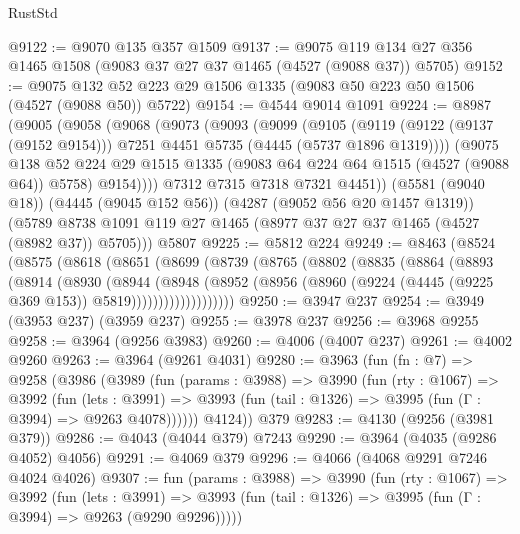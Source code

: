 \begin{lexlean}{RustStd}
\begin{coremodule}
@9122 := @9070 @135 @357 @1509
@9137 := @9075 @119 @134 @27 @356 @1465 @1508 (@9083 @37 @27 @37 @1465 (@4527 (@9088 @37)) @5705)
@9152 := @9075 @132 @52 @223 @29 @1506 @1335 (@9083 @50 @223 @50 @1506 (@4527 (@9088 @50)) @5722)
@9154 := @4544 @9014 @1091
@9224 := @8987
    (@9005
      (@9058
        (@9068
          (@9073
            (@9093
              (@9099
                (@9105
                  (@9119
                    (@9122 (@9137 (@9152 @9154)))
                    @7251
                    @4451
                    @5735
                    (@4445 (@5737 @1896 @1319))))
                (@9075
                  @138
                  @52
                  @224
                  @29
                  @1515
                  @1335
                  (@9083 @64 @224 @64 @1515 (@4527 (@9088 @64)) @5758)
                  @9154))))
          @7312
          @7315
          @7318
          @7321
          @4451))
      (@5581 (@9040 @18))
      (@4445 (@9045 @152 @56))
      (@4287 (@9052 @56 @20 @1457 @1319))
      (@5789 @8738 @1091 @119 @27 @1465 (@8977 @37 @27 @37 @1465 (@4527 (@8982 @37)) @5705)))
    @5807
@9225 := @5812 @224
@9249 := @8463
    (@8524
      (@8575
        (@8618
          (@8651
            (@8699
              (@8739
                (@8765
                  (@8802
                    (@8835
                      (@8864
                        (@8893
                          (@8914
                            (@8930
                              (@8944
                                (@8948
                                  (@8952
                                    (@8956
                                      (@8960
                                        (@9224 (@4445 (@9225 @369 @153)) @5819)))))))))))))))))))
@9250 := @3947 @237
@9254 := @3949 (@3953 @237) (@3959 @237)
@9255 := @3978 @237
@9256 := @3968 @9255
@9258 := @3964 (@9256 @3983)
@9260 := @4006 (@4007 @237)
@9261 := @4002 @9260
@9263 := @3964 (@9261 @4031)
@9280 := @3963
    (fun (fn : @7) =>
    @9258
      (@3986
        (@3989
          (fun (params : @3988) =>
          @3990
            (fun (rty : @1067) =>
            @3992
              (fun (lets : @3991) =>
              @3993 (fun (tail : @1326) => @3995 (fun (Γ : @3994) => @9263 @4078))))))
        @4124))
    @379
@9283 := @4130 (@9256 (@3981 @379))
@9286 := @4043 (@4044 @379) @7243
@9290 := @3964 (@4035 (@9286 @4052) @4056)
@9291 := @4069 @379
@9296 := @4066 (@4068 @9291 @7246 @4024 @4026)
@9307 := fun (params : @3988) =>
  @3990
    (fun (rty : @1067) =>
    @3992
      (fun (lets : @3991) =>
      @3993 (fun (tail : @1326) => @3995 (fun (Γ : @3994) => @9263 (@9290 @9296)))))

\end{coremodule}
\end{lexlean}
